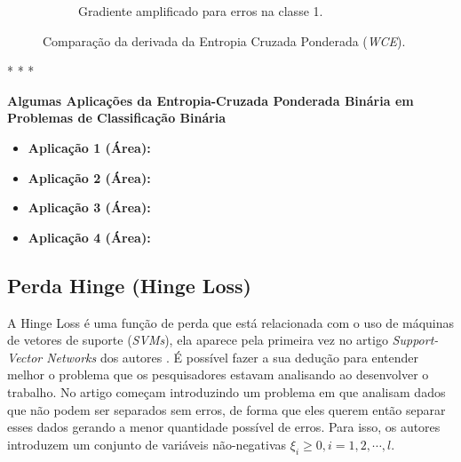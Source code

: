 \begin{figure}[h!]
\begin{subfigure}[b]{0.48\textwidth}
        \caption{Gradiente amplificado para erros na classe 1.}
        \label{fig:wce-derivada-alpha1}
    \end{subfigure}
    
    \caption{Comparação da derivada da Entropia Cruzada Ponderada (\textit{WCE}).}
    \label{fig:binary-weighted-cross-entropy-derivada-comparacao}
\end{figure}

\medskip
\begin{center}
 * * *
\end{center}
\medskip

\textbf{Algumas Aplicações da Entropia-Cruzada Ponderada Binária em Problemas de Classificação Binária}
\vspace{1em}

\begin{itemize}
    \item \textbf{Aplicação 1 (Área):}
    \item \textbf{Aplicação 2 (Área):}
    \item \textbf{Aplicação 3 (Área):}
    \item \textbf{Aplicação 4 (Área):}
\end{itemize}

\subsection{Perda Hinge (Hinge Loss)}

A Hinge Loss é uma função de perda que está relacionada com o uso de máquinas de vetores de suporte (\textit{SVMs}), ela aparece pela primeira vez no artigo \textit{Support-Vector Networks} dos autores \textcite{HingeLoss}. É possível fazer a sua dedução para entender melhor o problema que os pesquisadores estavam analisando ao desenvolver o trabalho. No artigo \textcite{HingeLoss} começam introduzindo um problema em que analisam dados que não podem ser separados sem erros, de forma que eles querem então separar esses dados gerando a menor quantidade possível de erros. Para isso, os autores introduzem um conjunto de variáveis não-negativas $\xi_i \ge 0, i = 1, 2, \cdots, l$. 

